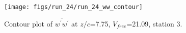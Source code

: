 \begin{figure}[H]
\centering
\texttt{[image: figs/run\_24/run\_24\_ww\_contour]}
\caption{Contour plot of $\overline{w^\prime w^\prime}$ at $z/c$=7.75, $V_{free}$=21.09, station 3.}
\label{fig:run_24_ww_contour}
\end{figure}



